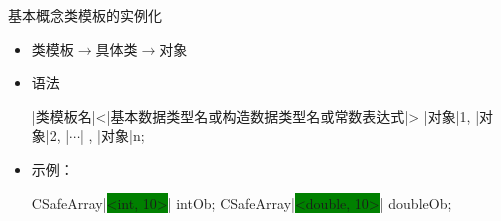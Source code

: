 \begin{frame}[t, fragile]{基本概念}{类模板的实例化}%
  \begin{spacing}{1.6}
  \begin{itemize}
  \item 类模板$\longrightarrow$具体类$\longrightarrow$对象
  \item 语法\\
    \begin{center}
      \begin{minipage}[t]{0.70\linewidth}
        \begin{cppttnobg}
|类模板名|<|\alert{基本数据类型名}或\alert{构造数据类型名}或\alert{常数表达式}|> |对象|1, |对象|2, |$\cdots$| , |对象|n;
        \end{cppttnobg}
      \end{minipage}
    \end{center}
  \item 示例：\\
    \begin{center}
      \begin{minipage}[t]{0.65\linewidth}
        \begin{cppttnobg}
CSafeArray|\colorbox{green}{<int, 10>}| intOb;          
CSafeArray|\colorbox{green}{<double, 10>}| doubleOb;
        \end{cppttnobg}
      \end{minipage}
    \end{center}
  \end{itemize}
  \end{spacing}
\end{frame}

